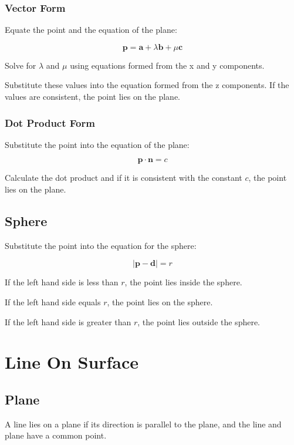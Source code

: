 \documentclass[a4paper,11pt]{article}
\newcommand{\bb}{\boldsymbol}
\begin{document}
\subsubsection{Vector Form}

Equate the point and the equation of the plane:

$$
\bb{p} = \bb{a} + \lambda \bb{b} + \mu \bb{c}
$$

Solve for $\lambda$ and $\mu$ using equations formed from the x and y
components.

Substitute these values into the equation formed from the z components. If the
values are consistent, the point lies on the plane.


\subsubsection{Dot Product Form}

Substitute the point into the equation of the plane:

$$
\bb{p} \cdot \bb{n} = c
$$

Calculate the dot product and if it is consistent with the constant $c$, the
point lies on the plane.


\subsection{Sphere}

Substitute the point into the equation for the sphere:

$$
\lvert \bb{p} - \bb{d} \rvert = r
$$

If the left hand side is less than $r$, the point lies inside the sphere.

If the left hand side equals $r$, the point lies on the sphere.

If the left hand side is greater than $r$, the point lies outside the sphere.




\section{Line On Surface}

\subsection{Plane}

A line lies on a plane if its direction is parallel to the plane, and the line
and plane have a common point.
\end{document}
